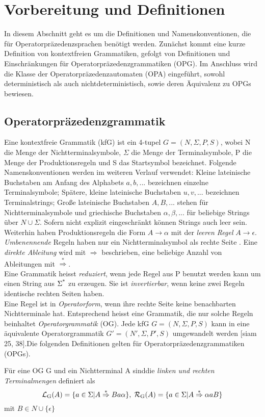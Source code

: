 \section{Vorbereitung und Definitionen}
In diesem Abschnitt geht es um die Definitionen und Namenskonventionen, die für Operatorpräzedenzsprachen benötigt werden. Zunächst kommt eine kurze Definition von kontextfreien Grammatiken, gefolgt von Definitionen und Einschränkungen für Operatorpräzedenzgrammatiken (OPG). Im Anschluss wird die Klasse der Operatorpräzedenzautomaten (OPA) eingeführt, sowohl deterministisch als auch nichtdeterministisch, sowie deren Äquivalenz zu OPGs bewiesen. 
\subsection{Operatorpräzedenzgrammatik}
Eine kontextfreie Grammatik (kfG) ist ein 4-tupel $G = (N, \Sigma, P, S)$, wobei N die Menge der Nichtterminalsymbole, $\Sigma$ die Menge der Terminalsymbole, P die Menge der Produktionsregeln und S das Startsymbol bezeichnet. Folgende Namenskonventionen werden im weiteren Verlauf verwendet: Kleine lateinische Buchstaben am Anfang des Alphabets $a, b, ...$ bezeichnen einzelne Terminalsymbole; Spätere, kleine lateinische Buchstaben $u,v, ...$ bezeichnen Terminalstrings; Große lateinische Buchstaben $A, B, ...$ stehen für Nichtterminalsymbole und griechische Buchstaben $\alpha, \beta, ...$ für beliebige Strings über $N \cup \Sigma$. Sofern nicht explizit eingeschränkt können Strings auch leer sein.\\
Weiterhin haben Produktionsregeln die Form $A \rightarrow \alpha$ mit der \textit{leeren Regel} $A \rightarrow \epsilon$. \textit{Umbenennende} Regeln haben nur ein Nichtterminalsymbol als rechte Seite . Eine \textit{direkte Ableitung} wird mit $\Rightarrow$ beschrieben, eine beliebige Anzahl von Ableitungen mit $\overset{*}{\Rightarrow}$.
\\
Eine Grammatik heisst \textit{reduziert}, wenn jede Regel aus P benutzt werden kann um einen String aus $\Sigma\textsuperscript{*}$ zu erzeugen. Sie ist \textit{invertierbar}, wenn keine zwei Regeln identische rechten Seiten haben.\\
Eine Regel ist in \textit{Operatorform}, wenn ihre rechte Seite keine benachbarten Nichtterminale hat. Entsprechend heisst eine Grammatik, die nur solche Regeln beinhaltet \textit{Operatorgrammatik} (OG). Jede kfG $G=(N,\Sigma, P, S)$ kann in eine äquivalente Operatorgrammatik $G'=(N', \Sigma, P', S)$ umgewandelt werden [siam 25, 38].Die folgenden Definitionen gelten für Operatorpräzedenzgrammatiken (OPGs). \\
\begin{definition}

Für eine OG G und ein Nichtterminal A sinddie \textit{linken und rechten Terminalmengen}  definiert als 
$$ \mathcal{L} \textsubscript{G}(A) = \{ a \in \Sigma | A \overset{*}{\Rightarrow} Ba \alpha \}, \;
 \mathcal{R} \textsubscript{G}(A) = \{ a \in \Sigma | A \overset{*}{\Rightarrow} \alpha aB \}$$
mit $B \in N \cup \{\epsilon\}$
\end{definition}

